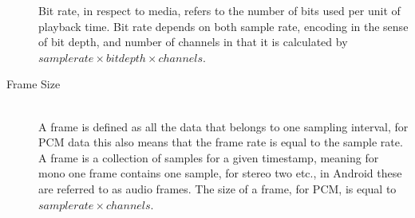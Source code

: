 \begin{description}
    Bit rate, in respect to media, refers to the number of bits used per unit of playback time.
    Bit rate depends on both sample rate, encoding in the sense of bit depth, and number of channels in that it is calculated by $sample rate \times bit depth \times channels$.
    \item [Frame Size]\cite{audioformat} \hfill \\
    A frame is defined as all the data that belongs to one sampling interval, for \ac{PCM} data this also means that the frame rate is equal to the sample rate.
    A frame is a collection of samples for a given timestamp, meaning for mono one frame contains one sample, for stereo two etc., in Android these are referred to as audio frames.
    The size of a frame, for \ac{PCM}, is equal to $sample rate \times channels$.
\end{description}

